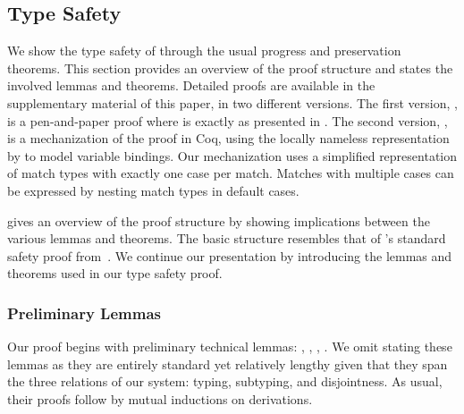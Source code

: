 \subsection{Type Safety}
\label{subsec:type-safety}

We show the type safety of \SystemFm through the usual progress and preservation theorems.
This section provides an overview of the proof structure and states the involved lemmas and theorems.
Detailed proofs are available in the supplementary material of this paper, in two different versions.
The first version, \cite{blanvillain2021type}, is a pen-and-paper proof where \SystemFm is exactly as presented in .
The second version, \cite{blanvillain2021artifact}, is a mechanization of the proof in Coq,
using the locally nameless representation by \citet{aydemir2008engineering} to model variable bindings.
Our mechanization uses a simplified representation of match types with exactly one case per match.
Matches with multiple cases can be expressed by nesting match types in default cases.


 gives an overview of the proof structure by showing implications between the various lemmas and theorems.
The basic structure resembles that of \SystemFsub's standard safety proof from~\citep{pierce2002types}.
We continue our presentation by introducing the lemmas and theorems used in our type safety proof.

\subsubsection*{Preliminary Lemmas}
Our proof begins with preliminary technical lemmas: , , , .
We omit stating these lemmas as they are entirely standard yet relatively lengthy given that they span the three relations of our system: typing, subtyping, and disjointness.
As usual, their proofs follow by mutual inductions on derivations.

